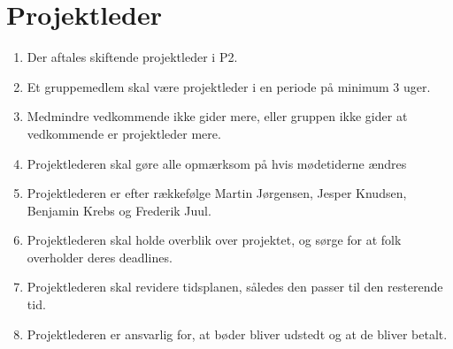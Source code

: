 \section{Projektleder}
\begin{enumerate}
\item{Der aftales skiftende projektleder i P2.}
\item{Et gruppemedlem skal være projektleder i en periode på minimum 3 uger.}
\item{Medmindre vedkommende ikke gider mere, eller gruppen ikke gider at
vedkommende er projektleder mere.}
\item{Projektlederen skal gøre alle opmærksom på hvis mødetiderne ændres}
\item{Projektlederen er efter rækkefølge Martin Jørgensen, Jesper Knudsen, Benjamin Krebs og Frederik Juul.}
\item{Projektlederen skal holde overblik over projektet, og sørge for at folk overholder deres deadlines.}
\item{Projektlederen skal revidere tidsplanen, således den passer til den resterende tid.}
\item{Projektlederen er ansvarlig for, at bøder bliver udstedt og at de bliver betalt.}
\end{enumerate}
